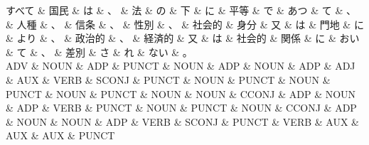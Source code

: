 \documentclass[tikz,border=5pt]{standalone}
\begin{document}
\small
\begin{dependency}[edge unit distance=8.3pt]
    \begin{deptext}[column sep=0.5em]
        すべて \& 国民 \& は \& 、 \& 法 \& の \& 下 \& に \& 平等 \& で \& あつ \& て \& 、 \& 人種 \& 、 \& 信条 \& 、 \& 性別 \& 、 \& 社会的 \& 身分 \& 又 \& は \& 門地 \& に \& より \& 、 \& 政治的 \& 、 \& 経済的 \& 又 \& は \& 社会的 \& 関係 \& に \& おい \& て \& 、 \& 差別 \& さ \& れ \& ない \& 。\\
        ADV \& NOUN \& ADP \& PUNCT \& NOUN \& ADP \& NOUN \& ADP \& ADJ \& AUX \& VERB \& SCONJ \& PUNCT \& NOUN \& PUNCT \& NOUN \& PUNCT \& NOUN \& PUNCT \& NOUN \& NOUN \& CCONJ \& ADP \& NOUN \& ADP \& VERB \& PUNCT \& NOUN \& PUNCT \& NOUN \& CCONJ \& ADP \& NOUN \& NOUN \& ADP \& VERB \& SCONJ \& PUNCT \& VERB \& AUX \& AUX \& AUX \& PUNCT\\
    \end{deptext}
\end{dependency}
\end{document}
